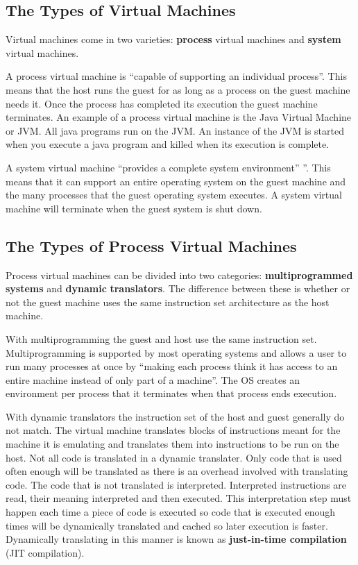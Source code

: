 \documentclass[english,a4paper]{article}
\begin{document}
\subsection{The Types of Virtual Machines}
Virtual machines come in two varieties: \textbf{process } virtual
machines and \textbf{system} virtual machines.

A process virtual machine is ``capable of supporting an individual
process''\cite[pg9]{JamesE.Smith2005}. This means that the host runs
the guest for as long as a process on the guest machine needs it. Once
the process has completed its execution the guest machine
terminates\cite[pg9]{JamesE.Smith2005}. An example of a process
virtual machine is the Java Virtual Machine or JVM. All java programs
run on the JVM. An instance of the JVM is started when you execute a
java program and killed when its execution is complete.

A system virtual machine ``provides a complete system environment''
''\cite[pg9]{JamesE.Smith2005}. This means that it can support an
entire operating system on the guest machine and the many processes
that the guest operating system executes. A system virtual machine
will terminate when the guest system is shut down.

\subsection{The Types of Process Virtual Machines}

Process virtual machines can be divided into two categories:
\textbf{multiprogrammed systems} and \textbf{dynamic}
\textbf{translators}. The difference between these is whether or not the
guest machine uses the same instruction set architecture as the host
machine.

With multiprogramming the guest and host use the same instruction
set. Multiprogramming is supported by most operating systems and
allows a user to run many processes at once by ``making each process
think it has access to an entire machine instead of only part of a
machine''\cite[pg13]{JamesE.Smith2005}. The OS creates an environment
per process that it terminates when that process ends execution.

With dynamic translators the instruction set of the host and guest
generally do not match. The virtual machine translates blocks of
instructions meant for the machine it is emulating and translates them
into instructions to be run on the host. Not all code is translated in
a dynamic translater. Only code that is used often enough will be
translated as there is an overhead involved with translating code. The
code that is not translated is interpreted. Interpreted instructions
are read, their meaning interpreted and then executed. This
interpretation step must happen each time a piece of code is executed
so code that is executed enough times will be dynamically translated
and cached so later execution is faster. Dynamically translating in
this manner is known as \textbf{just-in-time compilation} (JIT
compilation).
\end{document}
